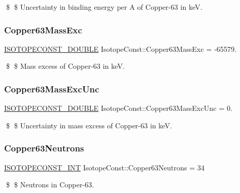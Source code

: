\$ \$ Uncertainty in binding energy per A of Copper-\/63 in keV. \mbox{\label{group___isotope_const-_copper-_cu63_ga9675582929a29d90952e60aaa2b65c89}} 
\subsubsection{\texorpdfstring{Copper63\+Mass\+Exc}{Copper63MassExc}}
{\footnotesize\ttfamily \mbox{\hyperlink{group___isotope_const-_macros_ga8f45a7272ce02c0b4c65c44636ed719a}{I\+S\+O\+T\+O\+P\+E\+C\+O\+N\+S\+T\+\_\+\+D\+O\+U\+B\+LE}} Isotope\+Const\+::\+Copper63\+Mass\+Exc = -\/65579.}

\$ \$ Mass excess of Copper-\/63 in keV. \mbox{\label{group___isotope_const-_copper-_cu63_gaedb9215071ddf84540602b5eee0e4763}} 
\subsubsection{\texorpdfstring{Copper63\+Mass\+Exc\+Unc}{Copper63MassExcUnc}}
{\footnotesize\ttfamily \mbox{\hyperlink{group___isotope_const-_macros_ga8f45a7272ce02c0b4c65c44636ed719a}{I\+S\+O\+T\+O\+P\+E\+C\+O\+N\+S\+T\+\_\+\+D\+O\+U\+B\+LE}} Isotope\+Const\+::\+Copper63\+Mass\+Exc\+Unc = 0.}

\$ \$ Uncertainty in mass excess of Copper-\/63 in keV. \mbox{\label{group___isotope_const-_copper-_cu63_ga89b74f829e2778ad4999c452c190b3e9}} 
\subsubsection{\texorpdfstring{Copper63\+Neutrons}{Copper63Neutrons}}
{\footnotesize\ttfamily \mbox{\hyperlink{group___isotope_const-_macros_ga5f18360b3e99483a35c32d789e62621c}{I\+S\+O\+T\+O\+P\+E\+C\+O\+N\+S\+T\+\_\+\+I\+NT}} Isotope\+Const\+::\+Copper63\+Neutrons = 34}

\$ \$ Neutrons in Copper-\/63. \mbox{\label{group___isotope_const-_copper-_cu63_gac424164498758a20eb779eb643a8bf31}} 
